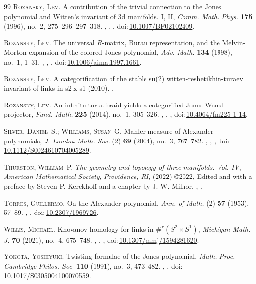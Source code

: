 \documentclass[11pt,hyp,]{nyjm}
\newcommand{\doi}[1]{doi:\,\href{http://dx.doi.org/#1}{#1}}
\numberwithin{thm}{section}
\theoremstyle{definition}
\theoremstyle{remark}
\begin{document}
\begin{thebibliography}{99}
		{\scshape Rozansky, Lev.} A contribution of the trivial connection to the {J}ones
			polynomial and {W}itten's invariant of {$3$}d manifolds. {I}, {II}, \emph{Comm.
		Math. Phys.} \textbf{175} (1996), no.~2, 275--296, 297--318. , , , \doi{10.1007/BF02102409}.
		
		{\scshape Rozansky, Lev.} The universal {$R$}-matrix, {B}urau representation, and the
			{M}elvin-{M}orton expansion of the colored {J}ones polynomial, \emph{Adv. Math.}
		\textbf{134} (1998), no.~1, 1--31. , , , \doi{10.1006/aima.1997.1661}.
		
		{\scshape Rozansky, Lev.} A categorification of the stable su(2)
			witten-reshetikhin-turaev invariant of links in s2 x s1 (2010). .
		
		{\scshape Rozansky, Lev.} An infinite torus braid yields a categorified
			{J}ones-{W}enzl projector, \emph{Fund. Math.} \textbf{225} (2014), no.~1, 305--326.
		, , , \doi{10.4064/fm225-1-14}.
		
		{\scshape Silver, Daniel~S.; Williams, Susan~G.} Mahler measure of {A}lexander
			polynomials, \emph{J. London Math. Soc.} (2) \textbf{69} (2004), no.~3, 767--782.
		, , , \doi{10.1112/S0024610704005289}.
		
		{\scshape Thurston, William~P.} \emph{The geometry and topology of three-manifolds. {V}ol.
			{IV}}, \emph{American Mathematical Society}, \emph{Providence, RI}, (2022) \copyright 2022,
		Edited and with a preface by Steven P. Kerckhoff and a chapter by J. W.
		Milnor. , .
		
		{\scshape Torres, Guillermo.} On the {A}lexander polynomial, \emph{Ann. of Math.} (2)
		\textbf{57} (1953), 57--89. , , \doi{10.2307/1969726}.
		
		{\scshape Willis, Michael.} Khovanov homology for links in {$\#^r(S^2\times S^1)$},
		\emph{Michigan Math. J.} \textbf{70} (2021), no.~4, 675--748. , , , \doi{10.1307/mmj/1594281620}.
		
		{\scshape Yokota, Yoshiyuki.} Twisting formulae of the {J}ones polynomial, \emph{Math.
		Proc. Cambridge Philos. Soc.} \textbf{110} (1991), no.~3, 473--482.
		, , \doi{10.1017/S0305004100070559}.
		
	\end{thebibliography}
	
\end{document}

